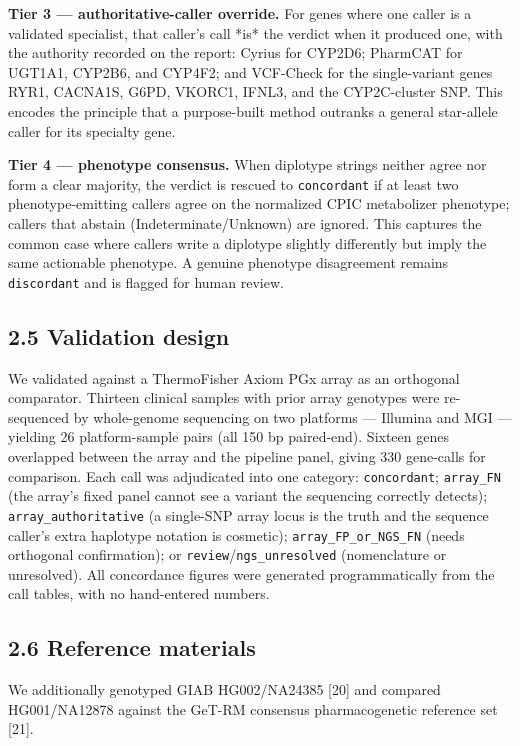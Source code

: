 \documentclass[11pt]{article}
\begin{document}
\textbf{Tier 3 --- authoritative-caller override.} For genes where one caller is a validated specialist, that caller's call *is* the verdict when it produced one, with the authority recorded on the report: Cyrius for CYP2D6; PharmCAT for UGT1A1, CYP2B6, and CYP4F2; and VCF-Check for the single-variant genes RYR1, CACNA1S, G6PD, VKORC1, IFNL3, and the CYP2C-cluster SNP. This encodes the principle that a purpose-built method outranks a general star-allele caller for its specialty gene.

\textbf{Tier 4 --- phenotype consensus.} When diplotype strings neither agree nor form a clear majority, the verdict is rescued to \texttt{concordant} if at least two phenotype-emitting callers agree on the normalized CPIC metabolizer phenotype; callers that abstain (Indeterminate/Unknown) are ignored. This captures the common case where callers write a diplotype slightly differently but imply the same actionable phenotype. A genuine phenotype disagreement remains \texttt{discordant} and is flagged for human review.

\subsection*{2.5 Validation design}

We validated against a ThermoFisher Axiom PGx array as an orthogonal comparator. Thirteen clinical samples with prior array genotypes were re-sequenced by whole-genome sequencing on two platforms --- Illumina and MGI --- yielding 26 platform-sample pairs (all 150 bp paired-end). Sixteen genes overlapped between the array and the pipeline panel, giving 330 gene-calls for comparison. Each call was adjudicated into one category: \texttt{concordant}; \texttt{array\_FN} (the array's fixed panel cannot see a variant the sequencing correctly detects); \texttt{array\_authoritative} (a single-SNP array locus is the truth and the sequence caller's extra haplotype notation is cosmetic); \texttt{array\_FP\_or\_NGS\_FN} (needs orthogonal confirmation); or \texttt{review}/\texttt{ngs\_unresolved} (nomenclature or unresolved). All concordance figures were generated programmatically from the call tables, with no hand-entered numbers.

\subsection*{2.6 Reference materials}

We additionally genotyped GIAB HG002/NA24385 [20] and compared HG001/NA12878 against the GeT-RM consensus pharmacogenetic reference set [21].
\end{document}
